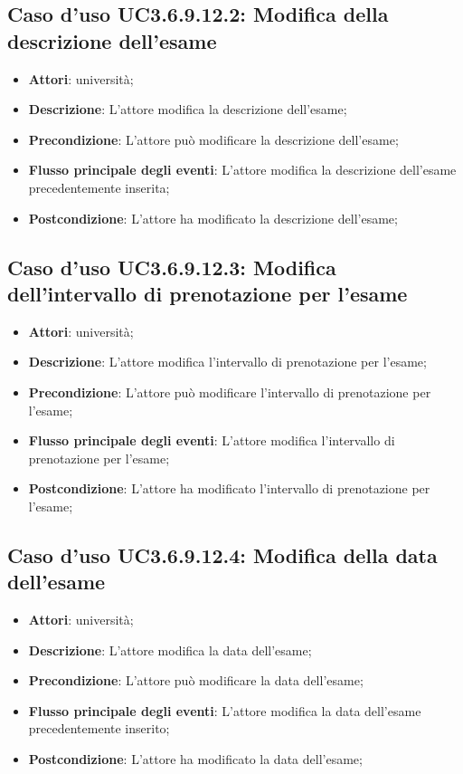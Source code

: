 \subsection{Caso d'uso \texorpdfstring{UC3.6.9.12.2}{UC3.6.9.12.2}: Modifica della descrizione dell’esame}
\begin{itemize}
\item \textbf{Attori}: università;
\item \textbf{Descrizione}: L'attore modifica la descrizione dell’esame;

\item \textbf{Precondizione}: L'attore può modificare la descrizione dell’esame;

\item \textbf{Flusso principale degli eventi}: L'attore modifica la descrizione dell’esame precedentemente inserita;

\item \textbf{Postcondizione}: L'attore ha modificato la descrizione dell’esame;

\end{itemize}
\subsection{Caso d'uso \texorpdfstring{UC3.6.9.12.3}{UC3.6.9.12.3}: Modifica dell’intervallo di prenotazione per l’esame}
\begin{itemize}
\item \textbf{Attori}: università;
\item \textbf{Descrizione}: L'attore modifica l'intervallo di prenotazione per l’esame;

\item \textbf{Precondizione}: L'attore può modificare l'intervallo di prenotazione per l’esame;

\item \textbf{Flusso principale degli eventi}: L'attore modifica l'intervallo di prenotazione per l’esame;

\item \textbf{Postcondizione}: L'attore ha modificato l'intervallo di prenotazione per l’esame;

\end{itemize}
\subsection{Caso d'uso \texorpdfstring{UC3.6.9.12.4}{UC3.6.9.12.4}: Modifica della data dell’esame}
\begin{itemize}
\item \textbf{Attori}: università;
\item \textbf{Descrizione}: L'attore modifica la data dell’esame;

\item \textbf{Precondizione}: L'attore può modificare la data dell’esame;

\item \textbf{Flusso principale degli eventi}: L'attore modifica la data dell’esame precedentemente inserito;

\item \textbf{Postcondizione}: L'attore ha modificato la data dell’esame;

\end{itemize}
